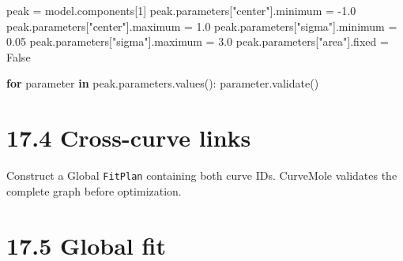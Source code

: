 \documentclass[
  10pt,
  a4paper,
  oneside]{scrreprt}
\newenvironment{Shaded}{}{}
\newcommand{\BuiltInTok}[1]{#1}
\newcommand{\ControlFlowTok}[1]{\textcolor[rgb]{0.00,0.44,0.13}{\textbf{#1}}}
\newcommand{\DecValTok}[1]{\textcolor[rgb]{0.25,0.63,0.44}{#1}}
\newcommand{\FloatTok}[1]{\textcolor[rgb]{0.25,0.63,0.44}{#1}}
\newcommand{\KeywordTok}[1]{\textcolor[rgb]{0.00,0.44,0.13}{\textbf{#1}}}
\newcommand{\NormalTok}[1]{#1}
\newcommand{\OperatorTok}[1]{\textcolor[rgb]{0.40,0.40,0.40}{#1}}
\newcommand{\StringTok}[1]{\textcolor[rgb]{0.25,0.44,0.63}{#1}}
\newcommand{\VariableTok}[1]{\textcolor[rgb]{0.10,0.09,0.49}{#1}}
\begin{document}
\begin{Shaded}
\begin{Highlighting}[]
\NormalTok{peak }\OperatorTok{=}\NormalTok{ model.components[}\DecValTok{1}\NormalTok{]}
\NormalTok{peak.parameters[}\StringTok{"center"}\NormalTok{].minimum }\OperatorTok{=} \OperatorTok{{-}}\FloatTok{1.0}
\NormalTok{peak.parameters[}\StringTok{"center"}\NormalTok{].maximum }\OperatorTok{=} \FloatTok{1.0}
\NormalTok{peak.parameters[}\StringTok{"sigma"}\NormalTok{].minimum }\OperatorTok{=} \FloatTok{0.05}
\NormalTok{peak.parameters[}\StringTok{"sigma"}\NormalTok{].maximum }\OperatorTok{=} \FloatTok{3.0}
\NormalTok{peak.parameters[}\StringTok{"area"}\NormalTok{].fixed }\OperatorTok{=} \VariableTok{False}

\ControlFlowTok{for}\NormalTok{ parameter }\KeywordTok{in}\NormalTok{ peak.parameters.values():}
\NormalTok{    parameter.validate()}
\end{Highlighting}
\end{Shaded}

\hypertarget{cross-curve-links}{%
\section{17.4 Cross-curve links}\label{cross-curve-links}}

\begin{Shaded}
\end{Shaded}

Construct a Global \texttt{FitPlan} containing both curve IDs. CurveMole
validates the complete graph before optimization.

\hypertarget{global-fit}{%
\section{17.5 Global fit}\label{global-fit}}
\end{document}
